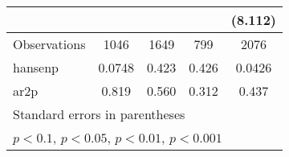 \begin{table}
\begin{center}
{\begin{tabular}{l*{4}{c}}
                    &                     &                     &                     &     (8.112)         \\
\hline
Observations        &        1046         &        1649         &         799         &        2076         \\
hansenp             &      0.0748         &       0.423         &       0.426         &      0.0426         \\
ar2p                &       0.819         &       0.560         &       0.312         &       0.437         \\
\hline\hline
\multicolumn{5}{l}{\footnotesize Standard errors in parentheses}\\
\multicolumn{5}{l}{\footnotesize \sym{+} \(p<0.1\), \sym{*} \(p<0.05\), \sym{**} \(p<0.01\), \sym{***} \(p<0.001\)}\\
\end{tabular}
}

\end{center}
\end{table}

